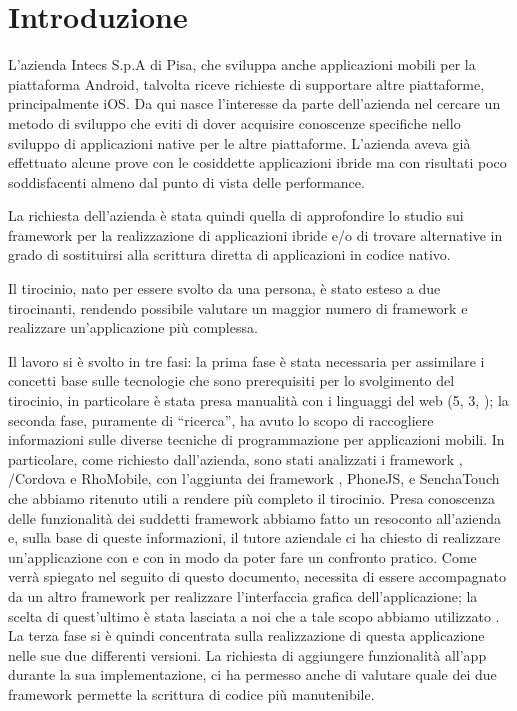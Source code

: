 \setcounter{page}{1}

\chapter{Introduzione}
    L'azienda Intecs S.p.A di Pisa, che sviluppa anche applicazioni mobili per la
    piattaforma Android, talvolta riceve richieste di supportare altre piattaforme,
    principalmente iOS. Da qui nasce l'interesse da parte dell'azienda nel
    cercare un metodo di sviluppo \crossplat{} che eviti di dover acquisire
    conoscenze specifiche nello sviluppo di applicazioni native per le altre
    piattaforme. L'azienda aveva già effettuato alcune prove con le cosiddette
    applicazioni ibride ma con risultati poco soddisfacenti almeno dal punto di
    vista delle performance.

    La richiesta dell'azienda è stata quindi quella di approfondire lo studio sui
    frame\-work per la realizzazione di applicazioni ibride e/o di trovare alternative
    in grado di sostituirsi alla scrittura diretta di applicazioni in codice
    nativo.

    Il tirocinio, nato per essere svolto da una persona, è stato esteso a due
    tirocinanti, rendendo possibile valutare un maggior numero di frame\-work e
    realizzare un'applicazione più complessa.

    Il lavoro si è svolto in tre fasi: la prima fase è stata necessaria per
    assimilare i concetti base sulle tecnologie che sono prerequisiti per lo
    svolgimento del tirocinio, in particolare è stata presa manualità con i
    linguaggi del web (\html{}5, \css{}3, \js{}); la seconda fase, puramente di
    ``ricerca'', ha avuto lo scopo di raccogliere informazioni sulle diverse
    tecniche di programmazione per applicazioni mobili. In particolare,
    come richiesto dall'azienda, sono
    stati analizzati i frame\-work \tisdk{},
    \pg{}/Cordova e RhoMobile, con l'aggiunta dei frame\-work
    \jqm{}, PhoneJS, \kendomob{} e SenchaTouch che abbiamo ritenuto
    utili a rendere più completo il tirocinio.
    Presa conoscenza delle funzionalità dei suddetti frame\-work abbiamo fatto un
    resoconto all'azienda e, sulla base di queste informazioni, il tutore
    aziendale ci ha chiesto di realizzare un'applicazione con \pg{} e con
    \tisdk{} in modo da poter fare un confronto pratico. Come verrà spiegato
    nel seguito di questo documento, \pg{} necessita di essere accompagnato da
    un altro frame\-work per realizzare l'interfaccia grafica
    dell'applicazione; la scelta di quest'ultimo è stata lasciata a noi che
    a tale scopo abbiamo utilizzato \kendomob{}.
    La terza fase si è quindi concentrata sulla realizzazione di questa
    applicazione nelle sue due differenti versioni. La richiesta di aggiungere
    funzionalità all'app durante la sua implementazione, ci ha permesso anche di
    valutare quale dei due frame\-work permette la scrittura di codice più
    manutenibile.

